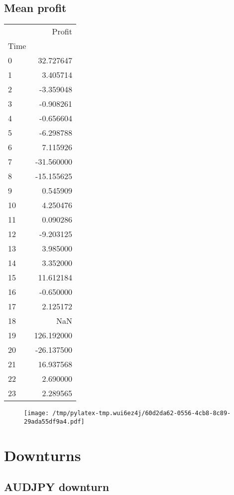 \documentclass{article}%
\begin{document}
\subsection{Mean profit }%
\label{subsec:Meanprofit}%
\begin{tabular}{lr}
\toprule
{} &      Profit \\
Time &             \\
\midrule
0    &   32.727647 \\
1    &    3.405714 \\
2    &   -3.359048 \\
3    &   -0.908261 \\
4    &   -0.656604 \\
5    &   -6.298788 \\
6    &    7.115926 \\
7    &  -31.560000 \\
8    &  -15.155625 \\
9    &    0.545909 \\
10   &    4.250476 \\
11   &    0.090286 \\
12   &   -9.203125 \\
13   &    3.985000 \\
14   &    3.352000 \\
15   &   11.612184 \\
16   &   -0.650000 \\
17   &    2.125172 \\
18   &         NaN \\
19   &  126.192000 \\
20   &  -26.137500 \\
21   &   16.937568 \\
22   &    2.690000 \\
23   &    2.289565 \\
\bottomrule
\end{tabular}
%


\begin{figure}[htbp]%
\centering%
\texttt{[image: /tmp/pylatex-tmp.wui6ez4j/60d2da62-0556-4cb8-8c89-29ada55df9a4.pdf]}%
\end{figure}

%
\newpage %
\section{Downturns}%
\label{sec:Downturns}%
\subsection{AUDJPY downturn}%
\label{subsec:AUDJPYdownturn}%
\end{document}
